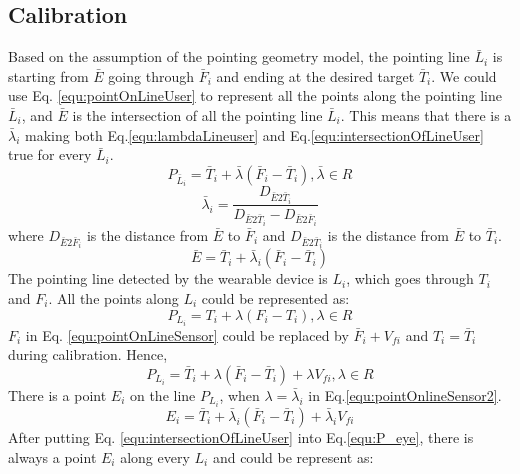 \subsection{Calibration} \label{sec:3-PAST:PASTCalibration}
Based on the assumption of the pointing geometry model, the pointing line $\bar L_i$ is starting from $\bar E$ going through $\bar F_i$ and ending at the desired target $\bar T_i$. We could use Eq. \ref{equ:pointOnLineUser} to  represent all the points along the pointing line $\bar L_i$, and $\bar E$ is the intersection of all the pointing line $\bar L_i$. This means that there is a $\bar \lambda_i$ making both Eq.\ref{equ:lambdaLineuser} and Eq.\ref{equ:intersectionOfLineUser} true for every  $\bar L_i$.
\begin{equation}  \label{equ:pointOnLineUser}
P_{\bar L_i} = {\bar T_i} + \bar\lambda ({\bar F_i} - {\bar T_i}) ,\bar\lambda \in R 
\end{equation}
\begin{equation} \label{equ:lambdaLineuser}
\bar\lambda_i = \frac {D_{\bar E2 \bar T_i}}{D_{\bar E2 \bar T_i} -D_{\bar E2 \bar F_i}} 
\end{equation}
where $D_{\bar E2 \bar F_i}$ is the distance from $\bar E$ to ${{\bar F_i}}$ and $D_{\bar E2 \bar T_i}$ is the distance from ${\bar E}$ to ${\bar T_i}$. 
\begin{equation} \label{equ:intersectionOfLineUser}
{\bar E} = {\bar T_i} + \bar\lambda_i ({\bar F_i} - {\bar T_i}) 
\end{equation}
The pointing line detected by the wearable device is $L_i$, which goes through  ${T_i}$ and $F_i$. All the points along $L_i$ could be represented as:
\begin{equation} \label{equ:pointOnLineSensor}
P_{L_i} = {T_i} + \lambda(F_i - {T_i}) , \lambda \in R 
\end{equation}
$F_i$ in Eq. \ref{equ:pointOnLineSensor} could be replaced by ${\bar F_i} + V_{fi}$ and ${T_i} = {\bar T_i}$ during calibration. Hence,
\begin{equation} \label{equ:pointOnlineSensor2}
P_{L_i} = {\bar T_i} + \lambda({\bar F_i} - {\bar T_i}) + \lambda V_{fi}, \lambda \in R 
\end{equation}
There is a point $E_i$ on the line $P_{L_i}$, when $\lambda = \bar\lambda_i$ in Eq.\ref{equ:pointOnlineSensor2}.
\begin{equation} \label{equ:P_eye}
E_i = {\bar T_i} + \bar\lambda_i({\bar F_i} - {\bar T_i}) + \bar\lambda_i V_{fi}  
\end{equation}
After putting Eq. \ref{equ:intersectionOfLineUser} into Eq.\ref{equ:P_eye}, there is always a point $E_i$ along every $L_i$ and could be represent as:

